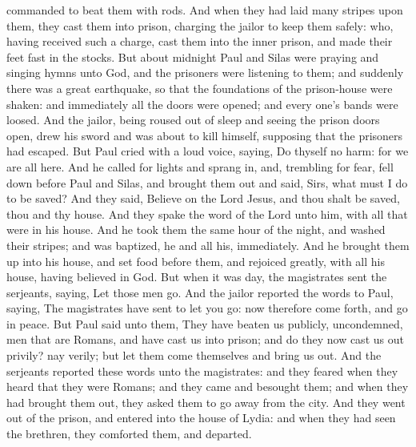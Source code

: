 commanded to beat them with rods. And when they had laid many stripes upon them, they cast them into prison, charging the jailor to keep them safely: who, having received such a charge, cast them into the inner prison, and made their feet fast in the stocks. But about midnight Paul and Silas were praying and singing hymns unto God, and the prisoners were listening to them; and suddenly there was a great earthquake, so that the foundations of the prison-house were shaken: and immediately all the doors were opened; and every one’s bands were loosed. And the jailor, being roused out of sleep and seeing the prison doors open, drew his sword and was about to kill himself, supposing that the prisoners had escaped. But Paul cried with a loud voice, saying, Do thyself no harm: for we are all here. And he called for lights and sprang in, and, trembling for fear, fell down before Paul and Silas, and brought them out and said, Sirs, what must I do to be saved? And they said, Believe on the Lord Jesus, and thou shalt be saved, thou and thy house. And they spake the word of the Lord unto him, with all that were in his house. And he took them the same hour of the night, and washed their stripes; and was baptized, he and all his, immediately. And he brought them up into his house, and set food before them, and rejoiced greatly, with all his house, having believed in God.  But when it was day, the magistrates sent the serjeants, saying, Let those men go. And the jailor reported the words to Paul, saying, The magistrates have sent to let you go: now therefore come forth, and go in peace. But Paul said unto them, They have beaten us publicly, uncondemned, men that are Romans, and have cast us into prison; and do they now cast us out privily? nay verily; but let them come themselves and bring us out. And the serjeants reported these words unto the magistrates: and they feared when they heard that they were Romans; and they came and besought them; and when they had brought them out, they asked them to go away from the city. And they went out of the prison, and entered into the house of Lydia: and when they had seen the brethren, they comforted them, and departed. 

